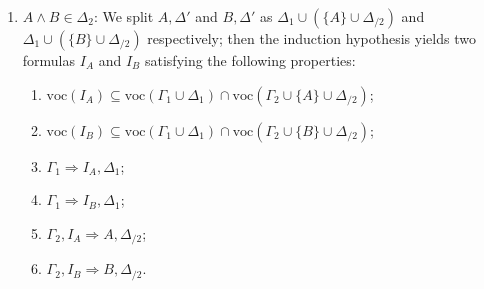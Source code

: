 \documentclass[a4paper]{article}
\newcommand{\voc}{\mathrm{voc}}
\begin{document}
\begin{itemize}
\begin{enumerate}
    To see that Requirement 1 is satisfied, we observe that $\voc(\Gamma_1 \cup \{A\} \cup \Delta_{/1}) \subseteq \voc(\Gamma_1 \cup \Delta_1)$ and $\voc(\Gamma_1 \cup \{B\} \cup \Delta_{/1}) \subseteq \voc(\Gamma_1 \cup \Delta_1)$.
    Hence $\voc(I_A \vee I_B) = \voc(I_A) \cup \voc(I_B) \subseteq \voc(\Gamma_1 \cup \Delta_1) \cap \voc(\Gamma_2 \cup \Delta_2)$ follows.

    Requirement 2 is verified by the following derivation:
    \[
      \begin{prooftree}
        \hypo{\Gamma_1 \Rightarrow I_A, A, \Delta_{/1}}
        \infer1[R$\vee$]{\Gamma_1 \Rightarrow I_A \vee I_B, A, \Delta_{/1}}
        \hypo{\Gamma_1 \Rightarrow I_B, B, \Delta_{/1}}
        \infer1[R$\vee$]{\Gamma_1 \Rightarrow I_A \vee I_B, B, \Delta_{/1}}
        \infer2[R$\wedge$ ($\Delta_1 = \Delta_{/1} \cup \{A \wedge B\}$)]{\Gamma_1 \Rightarrow I_A \vee I_B, A \wedge B, \Delta_{/1}}
      \end{prooftree}
    \]

    Requirement 3 is verified by the following derivation:
    \[
      \begin{prooftree}
        \hypo{\Gamma_2,I_A \Rightarrow \Delta_2}
        \hypo{\Gamma_2,I_B \Rightarrow \Delta_2}
        \infer2[L$\vee$]{\Gamma_2,I_A \vee I_B \Rightarrow \Delta_2}
      \end{prooftree}
    \]
    
  \item $A \wedge B \in \Delta_2$:
    We split $A,\Delta'$ and $B,\Delta'$ as $\Delta_1 \cup (\{A\} \cup \Delta_{/2})$ and $\Delta_1 \cup (\{B\} \cup \Delta_{/2})$ respectively; then the induction hypothesis yields two formulas $I_A$ and $I_B$ satisfying the following properties:
    \begin{enumerate}
    \item $\voc(I_A) \subseteq \voc(\Gamma_1 \cup \Delta_{1}) \cap \voc(\Gamma_2 \cup \{A\} \cup \Delta_{/2})$;
    \item $\voc(I_B) \subseteq \voc(\Gamma_1 \cup \Delta_{1}) \cap \voc(\Gamma_2 \cup \{B\} \cup \Delta_{/2})$;
    \item $\Gamma_1 \Rightarrow I_A,\Delta_{1}$;
    \item $\Gamma_1 \Rightarrow I_B,\Delta_{1}$;
    \item $\Gamma_2,I_A \Rightarrow A,\Delta_{/2}$;
    \item $\Gamma_2,I_B \Rightarrow B,\Delta_{/2}$.
    \end{enumerate}
    

\end{enumerate}
\end{itemize}
\end{document}
